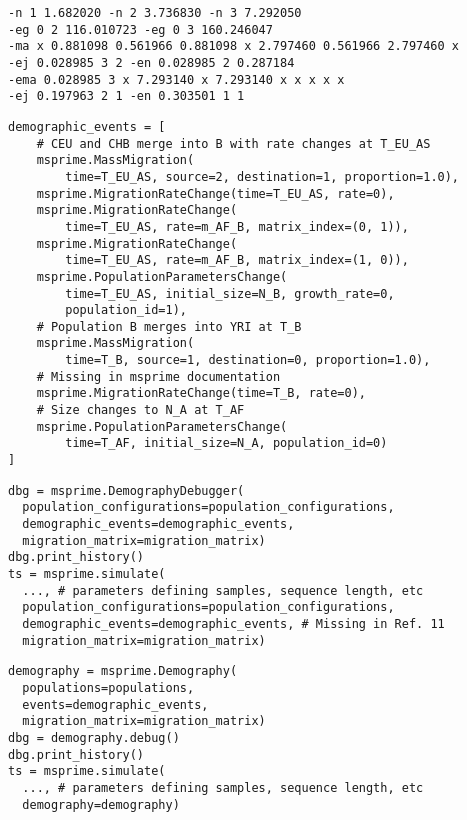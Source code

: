 \documentclass{article}
\begin{document}
\begin{verbatim}
-n 1 1.682020 -n 2 3.736830 -n 3 7.292050
-eg 0 2 116.010723 -eg 0 3 160.246047
-ma x 0.881098 0.561966 0.881098 x 2.797460 0.561966 2.797460 x
-ej 0.028985 3 2 -en 0.028985 2 0.287184
-ema 0.028985 3 x 7.293140 x 7.293140 x x x x x
-ej 0.197963 2 1 -en 0.303501 1 1
\end{verbatim}

\begin{verbatim}
demographic_events = [
    # CEU and CHB merge into B with rate changes at T_EU_AS
    msprime.MassMigration(
        time=T_EU_AS, source=2, destination=1, proportion=1.0),
    msprime.MigrationRateChange(time=T_EU_AS, rate=0),
    msprime.MigrationRateChange(
        time=T_EU_AS, rate=m_AF_B, matrix_index=(0, 1)),
    msprime.MigrationRateChange(
        time=T_EU_AS, rate=m_AF_B, matrix_index=(1, 0)),
    msprime.PopulationParametersChange(
        time=T_EU_AS, initial_size=N_B, growth_rate=0,
        population_id=1),
    # Population B merges into YRI at T_B
    msprime.MassMigration(
        time=T_B, source=1, destination=0, proportion=1.0),
    # Missing in msprime documentation
    msprime.MigrationRateChange(time=T_B, rate=0),
    # Size changes to N_A at T_AF
    msprime.PopulationParametersChange(
        time=T_AF, initial_size=N_A, population_id=0)
]
\end{verbatim}

\begin{verbatim}
dbg = msprime.DemographyDebugger(
  population_configurations=population_configurations,
  demographic_events=demographic_events,
  migration_matrix=migration_matrix)
dbg.print_history()
ts = msprime.simulate(
  ..., # parameters defining samples, sequence length, etc
  population_configurations=population_configurations,
  demographic_events=demographic_events, # Missing in Ref. 11
  migration_matrix=migration_matrix)
\end{verbatim}

\begin{verbatim}
demography = msprime.Demography(
  populations=populations,
  events=demographic_events,
  migration_matrix=migration_matrix)
dbg = demography.debug()
dbg.print_history()
ts = msprime.simulate(
  ..., # parameters defining samples, sequence length, etc
  demography=demography)
\end{verbatim}
\end{document}
